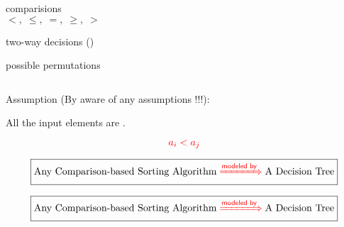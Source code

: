 \begin{frame}{}
  \begin{center}
    {\Large {}} 

    \pause
    \vspace{0.20cm}
    \begin{columns}
	\begin{description}[Leaves:]
	  \item[Nodes:] comparisions 
	    \[
	      <,\; \le,\; =,\; \ge,\; >
	    \]
	  \item[Edges:] two-way decisions ()
	  \item[Leaves:] possible permutations
	\end{description}
    \end{columns}

    \pause
    \vspace{0.60cm}
    \begin{alertblock}{Assumption (By aware of any assumptions !!!):}
      \centerline{All the input elements are .}
      \[
	\textcolor{red}{a_i < a_j}
      \]
    \end{alertblock}
  \end{center}
\end{frame}

\begin{frame}{}
  \begin{center}
    {\Large {}} 
  \end{center}

  \vspace{-0.40cm}
  \[
    \boxed{\text{Any Comparison-based Sorting Algorithm} \;\textcolor{red}{\xRightarrow{ \textsf{modeled by} }}\; \text{A Decision Tree}}
  \]


\end{frame}

\begin{frame}{}
  \begin{center}
    {\Large {}} 
  \end{center}

  \vspace{-0.40cm}
  \[
    \boxed{\text{Any Comparison-based Sorting Algorithm} \;\textcolor{red}{\xRightarrow{ \textsf{modeled by} }}\; \text{A Decision Tree}}
  \]

  
\end{frame}

